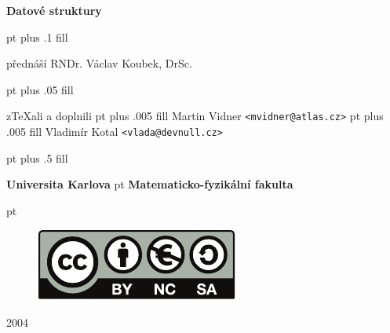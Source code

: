 \documentclass[a4paper]{report}
\theoremstyle{definition}
\begin{document}

\begin{titlepage}
  \begin{center}
  {\Huge\bf Datové struktury}

 pt plus .1 fill\relax

{\Large přednáší RNDr. Václav Koubek, DrSc.}

 pt plus .05 fill\relax

{\large z\TeX ali a doplnili 
 pt plus .005 fill\relax
Martin Vidner {\tt <mvidner@atlas.cz>}}
 pt plus .005 fill\relax
{\large Vladimír Kotal {\tt <vlada@devnull.cz>}}


   pt plus .5 fill\relax

  {\Large\bf Universita Karlova} 
   pt\relax
  {\large\bf Matematicko-fyzikální fakulta}

   pt\relax

\begin{figure}[htb!]
\begin{center}
\includegraphics{pics/by-nc-sa.pdf}
\end{center}
\end{figure}

  {\large 2004}

  \end{center}
\end{titlepage}
\end{document}
